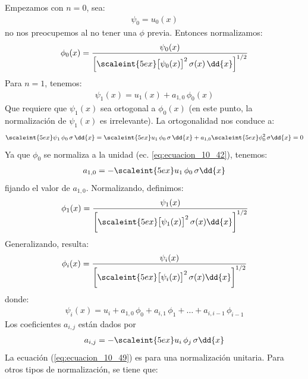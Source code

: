 Empezamos con $n = 0$, sea:
\begin{align}
\psi_{0} = u_{0}(x)
\label{eq:ecuacion_10_41}
\end{align}
no nos preocupemos al no tener una $\phi$ previa. Entonces normalizamos:
\begin{align}
\phi_{0}(x) = \dfrac{\psi_{0} (x)}{\left[ \displaystyle \scaleint{5ex} \big[ \psi_{0} (x) \big]^{2} \, \sigma (x) \, \dd{x} \right]^{1/2}}
\label{eq:ecuacion_10_42}
\end{align}
Para $n = 1$, tenemos:
\begin{align}
\psi_{1}(x) = u_{1}(x) + a_{1,0} \, \phi_{0}(x)
\label{eq:ecuacion_10_43}
\end{align}
Que requiere que $\psi_{1}(x)$ sea ortogonal a $\phi_{0}(x)$ (en este punto, la normalización de $\psi_{1}(x)$ es irrelevante). La ortogonalidad nos conduce a:
\begin{align}
\scaleint{5ex} \psi_{1} \, \phi_{0} \, \sigma \, \dd{x} = \scaleint{5ex} u_{1} \, \phi_{0} \, \sigma \, \dd{x} + a_{1,0} \scaleint{5ex} \phi_{0}^{2} \, \sigma \dd{x} = 0
\label{eq:ecuacion_10_44}
\end{align}
Ya que $\phi_{0}$ se normaliza a la unidad (ec. \ref{eq:ecuacion_10_42}), tenemos:
\begin{align}
a_{1,0} = - \scaleint{5ex} u_{1} \, \phi_{0} \, \sigma \dd{x}
\label{eq:ecuacion_10_45}
\end{align}
fijando el valor de $a_{1, 0}$. Normalizando, definimos:
\begin{align}
\phi_{1} (x) = \dfrac{\psi_{1} (x)}{\bigg[ \displaystyle \scaleint{5ex} \big[ \psi_{1} (x) \big]^{2} \, \sigma (x) \dd{x} \bigg]^{1/2}}
\label{eq:ecuacion_10_46}
\end{align}
Generalizando, resulta:
\begin{align}
\phi_{i}(x) = \dfrac{\psi_{i} (x)}{\bigg[ \displaystyle \scaleint{5ex} \big[ \psi_{i} (x) \big]^{2} \, \sigma (x) \dd{x} \bigg]^{1/2}}
\label{eq:ecuacion_10_47}
\end{align}
donde:
\begin{align}
\psi_{i}(x) = u_{i} + a_{1, 0} \, \phi_{0} + a_{i, 1} \, \phi_{1} + \ldots + a_{i, i-1} \, \phi_{i-1}
\label{eq:ecuacion_10_48}
\end{align}
Los coeficientes $a_{i, j}$ están dados por
\begin{align}
a_{i, j} = - \scaleint{5ex} u_{i} \, \phi_{j} \, \sigma  \dd{x}
\label{eq:ecuacion_10_49}
\end{align}
La ecuación (\ref{eq:ecuacion_10_49}) es para una normalización unitaria. Para otros tipos de normalización, se tiene que:
